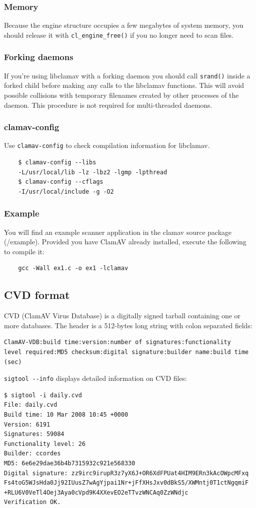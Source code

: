 \documentclass[a4paper,titlepage,12pt]{article}
\begin{document}
    \subsubsection{Memory}
    Because the engine structure occupies a few megabytes of system memory, you
    should release it with \verb+cl_engine_free()+ if you no longer need to
    scan files.

    \subsubsection{Forking daemons}
    If you're using libclamav with a forking daemon you should call
    \verb+srand()+ inside a forked child before making any calls to the
    libclamav functions. This will avoid possible collisions with temporary
    filenames created by other processes of the daemon. This procedure
    is not required for multi-threaded daemons.

    \subsubsection{clamav-config}
    Use \verb+clamav-config+ to check compilation information for libclamav.
    \begin{verbatim}
	$ clamav-config --libs
	-L/usr/local/lib -lz -lbz2 -lgmp -lpthread
	$ clamav-config --cflags
	-I/usr/local/include -g -O2
    \end{verbatim}

    \subsubsection{Example}
    You will find an example scanner application in the clamav source
    package (/example). Provided you have ClamAV already installed, execute
    the following to compile it:
    \begin{verbatim}
	gcc -Wall ex1.c -o ex1 -lclamav
    \end{verbatim}

    \subsection{CVD format}
    CVD (ClamAV Virus Database) is a digitally signed tarball containing
    one or more databases. The header is a 512-bytes long string with colon
    separated fields:
    \begin{verbatim}
ClamAV-VDB:build time:version:number of signatures:functionality
level required:MD5 checksum:digital signature:builder name:build time (sec)
    \end{verbatim}
    \verb+sigtool --info+ displays detailed information on CVD files:
    \begin{verbatim}
$ sigtool -i daily.cvd 
File: daily.cvd
Build time: 10 Mar 2008 10:45 +0000
Version: 6191
Signatures: 59084
Functionality level: 26
Builder: ccordes
MD5: 6e6e29dae36b4b7315932c921e568330
Digital signature: zz9irc9irupR3z7yX6J+OR6XdFPUat4HIM9ERn3kAcOWpcMFxq
Fs4toG5WJsHda0Jj92IUusZ7wAgYjpai1Nr+jFfXHsJxv0dBkS5/XWMntj0T1ctNgqmiF
+RLU6V0VeTl4Oej3Aya0cVpd9K4XXevEO2eTTvzWNCAq0ZzWNdjc
Verification OK.
    \end{verbatim}
\end{document}
